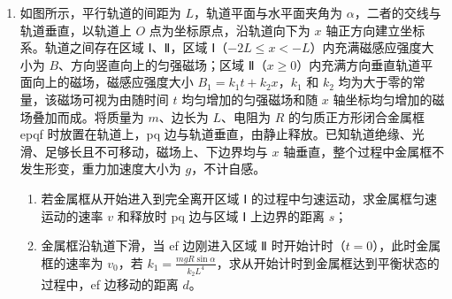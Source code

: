 \documentclass[\gkver]{gaokaozhenti}
\begin{document}
\begin{enumerate}
{联立解得 $v_{1} = 6 \Ums$、$v_{2} = \frac{2}{3} \Ums$

即小球速度为 $6 \Ums$，方向水平向左，方形物体速度为 $\frac{2}{3} \Ums$，方向水平向右。

（2）由于小球落在物块 a 正上方，并与其粘连，小球竖直方向速度变为 0，小球和物块 a 水平方向上动量守恒，则有 $mv_{1} = (m + m_{a})v_{3}$

解得 $v_{3} = 2 \Ums$

设当弹簧形变量为 $x_{1}$ 时物块 b 的固定解除，此时小球和物块 a 的速度为 $v_{4}$，根据胡克定律 $F = kx_{1}$

系统机械能守恒 $\frac{1}{2}(m + m_{a})v_{3}^{2} = \frac{1}{2}(m + m_{a})v_{4}^{2} + \frac{1}{2}kx_{1}^{2}$

联立解得 $v_{4} = 1 \Ums$，$x_{1} = 0.3 \Um$

固定解除之后，小球、物块 a 和物块 b 组成的系统动量守恒，当三者共速时，弹簧的弹性势能最大，由动量守恒定律有 $(m + m_{a})v_{4} = (m + m_{a} + m_{b})v_{b}$

解得 $v_{b} = \frac{2}{3} \Ums$，方向水平向左。

由能量守恒定律可得，最大弹性势能为

$E_{pm} = \frac{1}{2}(m + m_{a})v_{4}^{2} + \frac{1}{2}kx_{1}^{2} - \frac{1}{2}(m + m_{a} + m_{b})v_{b}^{2} = 2.5 \UJ$
}

\item
如图所示，平行轨道的间距为 $L$，轨道平面与水平面夹角为 $\alpha$，二者的交线与轨道垂直，以轨道上 $O$ 点为坐标原点，沿轨道向下为 $x$ 轴正方向建立坐标系。轨道之间存在区域 Ⅰ、Ⅱ，区域 Ⅰ（$-2L \leq x < -L$）内充满磁感应强度大小为 $B$、方向竖直向上的匀强磁场；区域 Ⅱ（$x \geq 0$）内充满方向垂直轨道平面向上的磁场，磁感应强度大小 $B_{1} = k_{1}t + k_{2}x$，$k_{1}$ 和 $k_{2}$ 均为大于零的常量，该磁场可视为由随时间 $t$ 均匀增加的匀强磁场和随 $x$ 轴坐标均匀增加的磁场叠加而成。将质量为 $m$、边长为 $L$、电阻为 $R$ 的匀质正方形闭合金属框 epqf 时放置在轨道上，pq 边与轨道垂直，由静止释放。已知轨道绝缘、光滑、足够长且不可移动，磁场上、下边界均与 $x$ 轴垂直，整个过程中金属框不发生形变，重力加速度大小为 $g$，不计自感。
\begin{enumerate}
	\item
	若金属框从开始进入到完全离开区域 Ⅰ 的过程中匀速运动，求金属框匀速运动的速率 $v$ 和释放时 pq 边与区域 Ⅰ 上边界的距离 $s$；
	\item
	金属框沿轨道下滑，当 ef 边刚进入区域 Ⅱ 时开始计时（$t = 0$），此时金属框的速率为 $v_{0}$，若 $k_{1} = \frac{mgR\sin\alpha}{k_{2}L^{4}}$，求从开始计时到金属框达到平衡状态的过程中，ef 边移动的距离 $d$。
\end{enumerate}


\end{enumerate}
\end{document}
